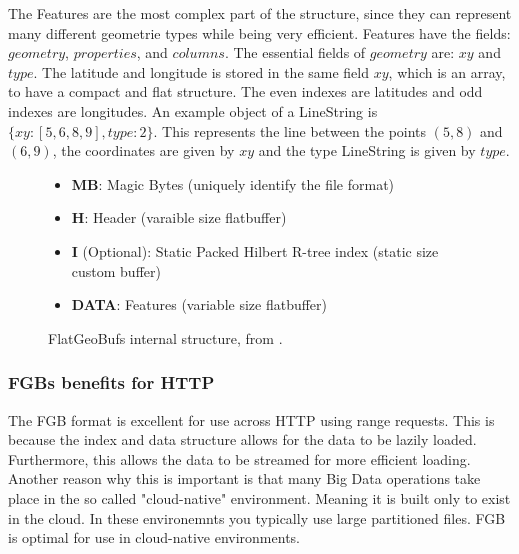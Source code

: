 The Features are the most complex part of the structure, since they can represent many different geometrie types while being very efficient. Features have the fields: $geometry$, $properties$, and $columns$. The essential fields of $geometry$ are: $xy$ and $type$. The latitude and longitude is stored in the same field $xy$, which is an array, to have a compact and flat structure. The even indexes are latitudes and odd indexes are longitudes. An example object of a LineString is $\{xy: [5, 6, 8, 9], type: 2\}$. This represents the line between the points $(5, 8)$ and $(6, 9)$, the coordinates are given by $xy$ and the type LineString is given by $type$.
\begin{figure}[h]
    \centering
    \begin{itemize}
        \item \textbf{MB}: Magic Bytes (uniquely identify the file format)
        \item \textbf{H}: Header (varaible size flatbuffer)
        \item \textbf{I} (Optional): Static Packed Hilbert R-tree index (static size custom buffer)
        \item \textbf{DATA}: Features (variable size flatbuffer)
    \end{itemize}
    \caption{ FlatGeoBufs internal structure, from \cite{fgb_org}. }
    \label{fig:fgb}
\end{figure}

\subsubsection{FGBs benefits for HTTP}
The FGB format is excellent for use across HTTP using range requests. This is because the index and data structure allows for the data to be lazily loaded. Furthermore, this allows the data to be streamed for more efficient loading. Another reason why this is important is that many Big Data operations take place in the so called "cloud-native" environment. Meaning it is built only to exist in the cloud. In these environemnts you typically use large partitioned files. FGB is optimal for use in cloud-native environments.

